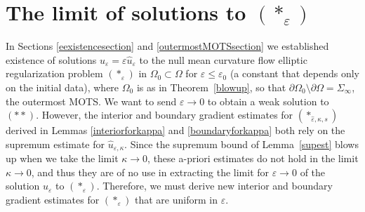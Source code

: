 \documentclass[11pt]{amsart}
\renewcommand{\epsilon}{\varepsilon}
\def\e{\epsilon}
\begin{document}
\section{The limit of solutions to $(*_{\varepsilon})$}
In Sections \ref{eexistencesection} and \ref{outermostMOTSsection} we established existence of solutions $u_{\varepsilon}=\varepsilon\hat{u}_{\varepsilon}$ to the null mean curvature flow elliptic regularization problem $(*_{\varepsilon})$ in ${\Omega}_0\subset {\Omega}$ for $\varepsilon\le \e_0$ (a constant that depends only on the initial data), where $\Omega_0$ is as in Theorem~\ref{blowup}, so that $\partial \Omega_0\setminus\partial \Omega=\Sigma_\infty$,  the outermost MOTS.
We want to send $\varepsilon\to0$ to obtain a weak solution to $(**)$. However, the interior and boundary gradient estimates for $(*_{\hat{\varepsilon},\kappa,s})$ derived in Lemmas \ref{interiorforkappa} and \ref{boundaryforkappa} both rely on the supremum estimate for $\hat{u}_{\varepsilon,\kappa}$. Since the supremum bound of Lemma~\ref{supest} blows up when we take the limit $\kappa\to0$, these a-priori estimates do not hold in the limit $\kappa\to0$, and thus they are of no use in extracting the limit for $\varepsilon\to0$ of the solution $u_{\varepsilon}$ to $(*_{\varepsilon})$. Therefore, we must derive new interior and boundary gradient estimates for $(*_{\varepsilon})$ that are uniform in $\varepsilon$. 
\end{document}

